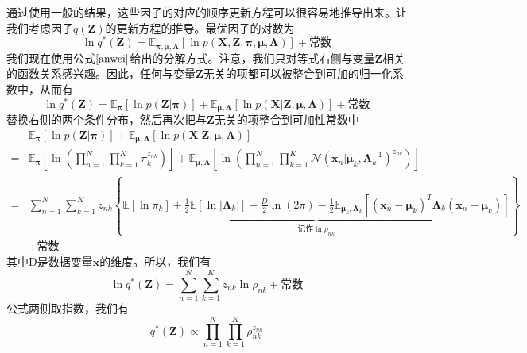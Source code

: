 通过使用一般的结果，这些因子的对应的顺序更新方程可以很容易地推导出来。让我们考虑因子$q(\boldsymbol{Z})$的更新方程的推导。最优因子的对数为
\begin{equation}
	\ln q^*(\boldsymbol{Z})=\mathbb{E}_{\boldsymbol{\pi},\boldsymbol{\mu},\boldsymbol{\Lambda}}[\ln p(\boldsymbol{X},\boldsymbol{Z},\boldsymbol{\pi},\boldsymbol{\mu},\boldsymbol{\Lambda})]+\text{常数}
\end{equation}
我们现在使用公式$\ref{anwei}$给出的分解方式。注意，我们只对等式右侧与变量$\boldsymbol{Z}$相关的函数关系感兴趣。因此，任何与变量$\boldsymbol{Z}$无关的项都可以被整合到可加的归一化系数中，从而有
\begin{equation}
	\ln q^*(\boldsymbol{Z})=\mathbb{E}_{\boldsymbol{\pi}}[\ln p(\boldsymbol{Z}|\boldsymbol{\pi})]+\mathbb{E}_{\boldsymbol{\mu},\boldsymbol{\Lambda}}[\ln p(\boldsymbol{X}|\boldsymbol{Z},\boldsymbol{\mu},\boldsymbol{\Lambda})]+\text{常数}
\end{equation}
替换右侧的两个条件分布，然后再次把与$\boldsymbol{Z}$无关的项整合到可加性常数中
\begin{equation}
\label{wencun}
	\begin{aligned}
		&\mathbb{E}_{\boldsymbol{\pi}}[\ln p(\boldsymbol{Z}|\boldsymbol{\pi})]+\mathbb{E}_{\boldsymbol{\mu},\boldsymbol{\Lambda}}[\ln p(\boldsymbol{X}|\boldsymbol{Z},\boldsymbol{\mu},\boldsymbol{\Lambda})]\\
		=&\mathbb{E}_{\boldsymbol{\pi}}\left[\ln \left(\prod_{n=1}^{N}\prod_{k=1}^{K}\pi_k^{z_{nk}}\right)\right]+\mathbb{E}_{\boldsymbol{\mu},\boldsymbol{\Lambda}}\left[\ln \left(\prod_{n=1}^{N}\prod_{k=1}^{K}\mathcal{N}(\boldsymbol{x}_n|\boldsymbol{\mu}_k,\boldsymbol{\Lambda}_k^{-1})^{z_{nk}}\right)\right]\\
		=&\sum_{n=1}^{N}\sum_{k=1}^{K}z_{nk}\left\{\underbrace{\mathbb{E}[\ln \pi_k]+\frac{1}{2}\mathbb{E}[\ln|\boldsymbol{\Lambda}_k|]-\frac{D}{2}\ln(2\pi)-\frac{1}{2}\mathbb{E}_{\boldsymbol{\mu}_k,\boldsymbol{\Lambda}_k}[(\boldsymbol{x}_n-\boldsymbol{\mu}_k)^T\boldsymbol{\Lambda}_k(\boldsymbol{x}_n-\boldsymbol{\mu}_k)]}_{\text{记作}\ln \rho_{nk}}  \right\}\\
		 &+\text{常数}
	\end{aligned}
\end{equation}
其中D是数据变量$\boldsymbol{x}$的维度。所以，我们有
\begin{equation}
	\ln q^*(\boldsymbol{Z})=\sum_{n=1}^{N}\sum_{k=1}^{K}z_{nk}\ln \rho_{nk}+\text{常数}
\end{equation}
公式两侧取指数，我们有
\begin{equation}
\label{qz}
	q^*(\boldsymbol{Z})\propto \prod_{n=1}^{N}\prod_{k=1}^{K}\rho_{nk}^{z_{nk}}
\end{equation}
